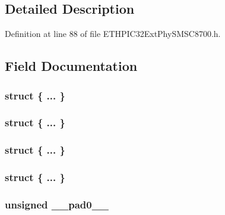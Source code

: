 \subsection{Detailed Description}


Definition at line 88 of file E\+T\+H\+P\+I\+C32\+Ext\+Phy\+S\+M\+S\+C8700.\+h.



\subsection{Field Documentation}
\hypertarget{union_____m_o_d_e_c_t_r_lbits__t_ac8e159fd9a654f5c5525ac119b2e2f4f}{}\subsubsection[{"@216}]{\setlength{\rightskip}{0pt plus 5cm}struct \{ ... \} }\label{union_____m_o_d_e_c_t_r_lbits__t_ac8e159fd9a654f5c5525ac119b2e2f4f}
\hypertarget{union_____m_o_d_e_c_t_r_lbits__t_a1801d4771525acab4530bc708945be38}{}\subsubsection[{"@218}]{\setlength{\rightskip}{0pt plus 5cm}struct \{ ... \} }\label{union_____m_o_d_e_c_t_r_lbits__t_a1801d4771525acab4530bc708945be38}
\hypertarget{union_____m_o_d_e_c_t_r_lbits__t_a3bfa5cf37b3f49e73515ad046e4dc404}{}\subsubsection[{"@244}]{\setlength{\rightskip}{0pt plus 5cm}struct \{ ... \} }\label{union_____m_o_d_e_c_t_r_lbits__t_a3bfa5cf37b3f49e73515ad046e4dc404}
\hypertarget{union_____m_o_d_e_c_t_r_lbits__t_a94f4e6438eba4641e0ea47c81b86ea1e}{}\subsubsection[{"@246}]{\setlength{\rightskip}{0pt plus 5cm}struct \{ ... \} }\label{union_____m_o_d_e_c_t_r_lbits__t_a94f4e6438eba4641e0ea47c81b86ea1e}
\hypertarget{union_____m_o_d_e_c_t_r_lbits__t_adf71f3d8410c1f1dbbc96680a92c49af}{}
\subsubsection[{\+\_\+\+\_\+pad0\+\_\+\+\_\+}]{\setlength{\rightskip}{0pt plus 5cm}unsigned \+\_\+\+\_\+pad0\+\_\+\+\_\+}\label{union_____m_o_d_e_c_t_r_lbits__t_adf71f3d8410c1f1dbbc96680a92c49af}


